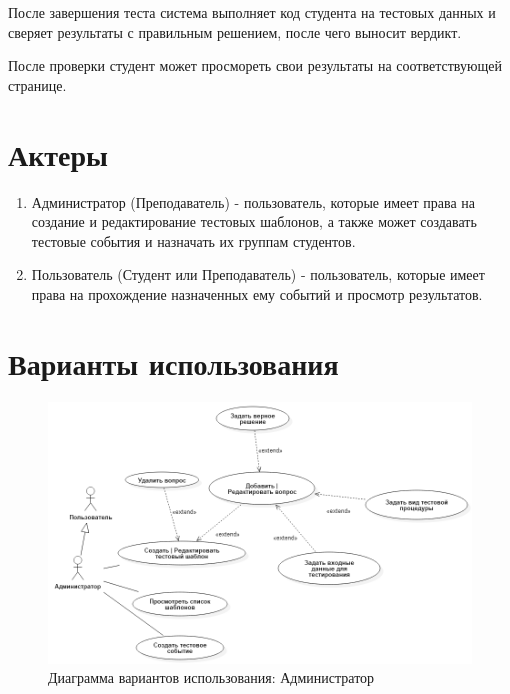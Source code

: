 \documentclass{article}
\begin{document}
    После завершения теста система выполняет код студента на тестовых данных
    и сверяет результаты с правильным решением, после чего выносит вердикт.

    После проверки студент может просмореть свои результаты на соответствующей странице.


    \section{Актеры}
    \begin{enumerate}
        \item Администратор (Преподаватель) - пользователь, которые имеет 
        права на создание и редактирование тестовых шаблонов, а также может
         создавать тестовые события и назначать их группам студентов.
        \item Пользователь (Студент или Преподаватель) - пользователь, которые
        имеет права на прохождение назначенных ему событий и просмотр результатов.
    \end{enumerate}
    
    \section{Варианты использования}
    \begin{figure}[H]
        \includegraphics[width=\textwidth, center]{UseCase_Admin.png}
        \caption{Диаграмма вариантов использования: Администратор}
    \end{figure}
\end{document}
